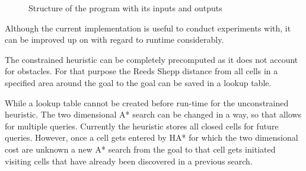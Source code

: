 \begin{figure}[h]
    \caption{Structure of the program with its inputs and outputs}
    \label{fig:programStructure}
\end{figure}

Although the current implementation is useful to conduct experiments with, it can be improved up on with regard to runtime considerably.

The constrained heuristic can be completely precomputed as it does not account for obstacles. For that purpose the Reeds Shepp distance from all cells in a specified area around the goal to the goal can be saved in a lookup table.

While a lookup table cannot be created before run-time for the unconstrained heuristic. The two dimensional A* search can be changed in a way, so that allows for multiple queries. Currently the heuristic stores all closed cells for future queries. However, once a cell gets entered by HA* for which the two dimensional cost are unknown a new A* search from the goal to that cell gets initiated visiting cells that have already been discovered in a previous search.


